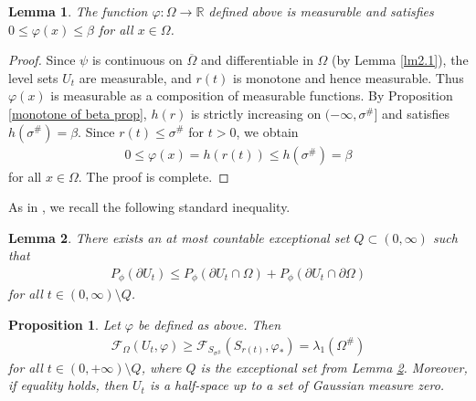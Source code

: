 \documentclass[11pt,leqno]{amsart}
\newtheorem{lemma}{Lemma}[section]
\newtheorem{proposition}{Proposition}[section]
\def\l{\lambda}
\def\p{\partial}
\def \p {\partial}
\numberwithin{equation}{section}
\begin{document}
\begin{lemma}
    The function $\varphi: \Omega\rightarrow \mathbb{R}$ defined above is measurable and  satisfies  $0\leq \varphi(x)\le \beta$ for all $x\in \Omega$.
\end{lemma}
\begin{proof}
Since $\psi$ is continuous on $\overline{\Omega}$ and differentiable in $\Omega$ (by Lemma \ref{lm2.1}), the level sets $U_t$ are measurable, and  $r(t)$ is monotone and hence measurable. Thus $\varphi(x)$ is measurable as a composition of measurable functions. 
By Proposition \ref{monotone of beta prop}, 
$h(r)$
is strictly increasing on $(-\infty, \sigma^\#]$ and satisfies
$h(\sigma^\#)=\beta$. Since $r(t)\le \sigma^\#$ for $t>0$, we obtain
\begin{align*}
    0\le \varphi(x)=h(r(t))\le h(\sigma^\#)=\beta
\end{align*}
for all $x\in \Omega$. The proof is complete.
\end{proof}
As in \cite[Lemma 5.2]{BucurCV}, we recall the following standard inequality.
\begin{lemma}\label{lm5.2}
    There exists an at most countable exceptional set $Q\subset (0,\infty)$ such that 
    \begin{align*}
            P_{\phi }(\partial U_{t})\leq P_{\phi }(\partial U_{t}\cap \Omega)+P_{\phi }(\partial U_{t}\cap \p \Omega)
    \end{align*}
    for all $t\in (0,\infty)\setminus Q$.
\end{lemma}

\begin{proposition}\label{F geq lambda}
    Let $\varphi$ be  defined as above. Then
\begin{align*}
\mathcal{F}_{\Omega}(U_t, \varphi) \geq \mathcal{F}_{S_{\sigma^\#}}(S_{r(t)}, \varphi_*)=\l_1(\Omega^\#) 
\end{align*}
for all $t \in (0,+\infty)\setminus Q$, where $Q$ is the exceptional set from Lemma \ref{lm5.2}. Moreover, if equality holds, then $U_t$ is a half-space up to a set of Gaussian measure zero.
\end{proposition}
\end{document}
